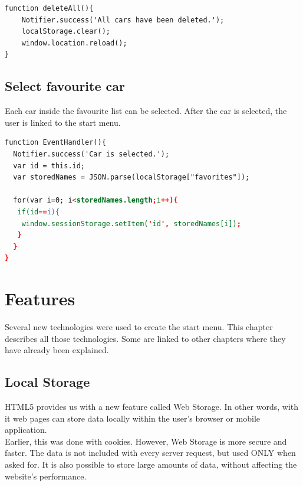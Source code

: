 \begin{lstlisting}[language=html, caption= 
Delete all function,captionpos=b]
function deleteAll(){
    Notifier.success('All cars have been deleted.');
	localStorage.clear();
    window.location.reload();
}
\end{lstlisting}

\subsection{Select favourite car}
Each car inside the favourite list can be selected. After the car is selected, the user is linked to the start menu.
\\

\begin{lstlisting}[language=html, caption=
Select car function,captionpos=b] 
function EventHandler(){
  Notifier.success('Car is selected.');
  var id = this.id;
  var storedNames = JSON.parse(localStorage["favorites"]);
	
  for(var i=0; i<storedNames.length;i++){
   if(id==i){
    window.sessionStorage.setItem('id', storedNames[i]);
   }
  }
}
\end{lstlisting}

\newpage




















\section{Features}
Several new technologies were used to create the start menu. This chapter describes all those technologies. Some are linked to other chapters where they have already been explained. 
\\
\subsection{Local Storage}

HTML5 provides us with a new feature called Web Storage. In other words, with it web pages can store data locally within the user's browser or mobile application.
\\

Earlier, this was done with cookies. However, Web Storage is more secure and faster. The data is not included with every server request, but used ONLY when asked for. It is also possible to store large amounts of data, without affecting the website's performance.\cite{w3school}
\\

